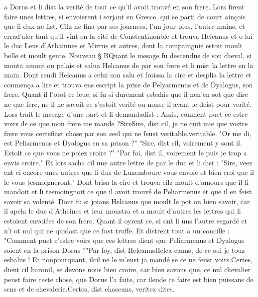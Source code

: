 \documentclass{article}
\begin{document}
\begin{pages}
   a Dorus et li dist la verité de tout ce qu’il avoit trouvé en 
      son frere. Lors firent faire unes lettres, si envoierent i 
   serjant en 
   Gresce, qui se parti de court ainçois que li dux ne fist. 
   Cilz ne fina par ses journees, l’un jour plus, l’autre mains,
   et errad'aler 
   tant qu’il vint en la cité de 
   Constentinonble et trouva Helcanus et o lui 
   le duc Leus d’Athainnes et Mirrus 
   et autres, dont la compaingnie estoit moult belle et moult gente. 
   Nouveau § BQuant le mesage fu descendus de son cheval, 
   si monta amont ou palais et salua Helcanus de par 
   son frere et li mist la lettre en la main. Dont rendi Helcanus 
   a celui son salu et froissa la cire et desplia la lettre et conmença a lire 
   et trouva ens escript la prise de 
   Pelyarmenus et de Dyalogus, son frere. 
   Quant il l’otot ce leue, si fu si 
   durement esbahis que il 
   nen'en sot 
   que dire ne que fere, 
   ne il ne savoit ce s’estoit verité ou nonse il avant le deist pour verité. 
   Lors trait le mesage d’une part et li 
   demandadist :
   Amis, conment puet ce estre voirs de ce 
      que mon frere me mande ?SireSire, dist cil, 
      je ne cuit mie que vostre frere vous certefiast chose par son seel qui ne feust 
      veritable.veritable.
      "Or me di, est Peliarmenus et Dyalogus en sa prison ?" 
      "Sire, dist cil, voirement y sont il. Estoit ce que vous ne poiez croire ?"
      "Par foi, dist il, voirement le puis je trop a envis croire."
      Et lors sacha cil une autre lettre de par le duc et li dist : 
      "Sire, veez ent ci encore unes autres que li dus de Luxembourc vous envoie et bien croi que il le vous tesmoigneront."
      Dont brisa la cire et trouva cilz moult d'amours que il li mandoit et li tesmoingnoit ce que il avoit trouvé de Peliarmenus et
      que il en feist savoir sa volenté. Dont fu si joians Helcanus que moult le pot on bien savoir, car il apela le duc d'Atheines et leur moustra 
      et a moult d'autres les lettres qui li estoient envoiées de son frere. Quant il oyrent ce, si ont li uns l'autre esgardé et n'i ot nul 
      qui ne quidast que ce fust truffe. Et distrent tout a un concille : "Comment puet c'estre voirs que ces lettres dient 
      que Peliarmenus et Dyalogus soient en la prison Dorus ?"Par foy, dist 
      HelcanusHelca-canus, 
      de ce sui je touz esbahis ! Et nonpourquant, ilcil ne le m’eust 
      ja mandé se ce ne feust voirs.Certes, dient cil baronil, 
      se devons nous bien croire, car bien savons que, 
      ce nul chevalier peust faire ceste chose, que Dorus l’a faite, 
         car ilende ce faire est bien puissans de sens et de chevalerie.Certes, dist chascuns, veritez dites. \pend

\end{pages}
\end{document}

